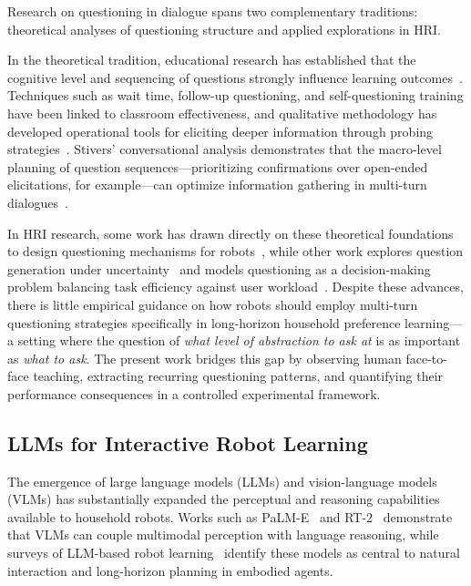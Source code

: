 \documentclass[manuscript,review,anonymous]{acmart}
\begin{document}
Research on questioning in dialogue spans two complementary traditions: theoretical analyses of questioning structure and applied explorations in HRI.

In the theoretical tradition, educational research has established that the cognitive level and sequencing of questions strongly influence learning outcomes~\cite{redfield1981meta,tofade2013best}. Techniques such as wait time, follow-up questioning, and self-questioning training have been linked to classroom effectiveness, and qualitative methodology has developed operational tools for eliciting deeper information through probing strategies~\cite{robinson2023probing,balza2022effective,dejonckheere2019semistructured}. Stivers' conversational analysis demonstrates that the macro-level planning of question sequences---prioritizing confirmations over open-ended elicitations, for example---can optimize information gathering in multi-turn dialogues~\cite{stivers2010overview}.

In HRI research, some work has drawn directly on these theoretical foundations to design questioning mechanisms for robots~\cite{hu2024designing,cakmak2012designing,habibian2022here}, while other work explores question generation under uncertainty~\cite{shin2023uncertainty} and models questioning as a decision-making problem balancing task efficiency against user workload~\cite{adamson2021we,singh2022ask4help}. Despite these advances, there is little empirical guidance on how robots should employ multi-turn questioning strategies specifically in long-horizon household preference learning---a setting where the question of \textit{what level of abstraction to ask at} is as important as \textit{what to ask}. The present work bridges this gap by observing human face-to-face teaching, extracting recurring questioning patterns, and quantifying their performance consequences in a controlled experimental framework.

\subsection{LLMs for Interactive Robot Learning}
\label{sec:related:llm}

The emergence of large language models (LLMs) and vision-language models (VLMs) has substantially expanded the perceptual and reasoning capabilities available to household robots. Works such as PaLM-E~\cite{driess2023palm} and RT-2~\cite{zitkovich2023rt} demonstrate that VLMs can couple multimodal perception with language reasoning, while surveys of LLM-based robot learning~\cite{ma2024survey,zeng2023large} identify these models as central to natural interaction and long-horizon planning in embodied agents.
\end{document}
